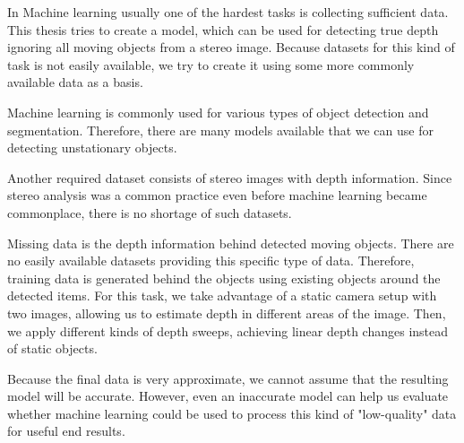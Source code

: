 In Machine learning usually one of the hardest tasks is collecting sufficient data.
This thesis tries to create a model, which can be used for detecting true depth ignoring all moving objects from a stereo image.  
Because datasets for this kind of task is not easily available, we try to create it using some more commonly available data as a basis.

Machine learning is commonly used for various types of object detection and segmentation.
Therefore, there are many models available that we can use for detecting unstationary objects.  

Another required dataset consists of stereo images with depth information.
Since stereo analysis was a common practice even before machine learning became commonplace, there is no shortage of such datasets.  

Missing data is the depth information behind detected moving objects. There are no easily available datasets providing this specific type of data.  
Therefore, training data is generated behind the objects using existing objects around the detected items.
For this task, we take advantage of a static camera setup with two images, allowing us to estimate depth in different areas of the image.
Then, we apply different kinds of depth sweeps, achieving linear depth changes instead of static objects.  

Because the final data is very approximate, we cannot assume that the resulting model will be accurate.  
However, even an inaccurate model can help us evaluate whether machine learning could be used to process this kind of "low-quality" data for useful end results.
